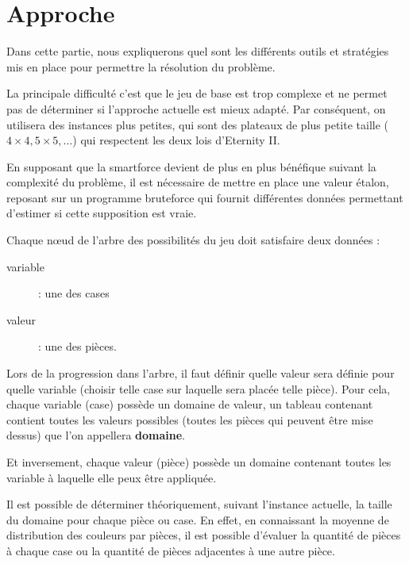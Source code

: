 
\section{Approche}

	Dans cette partie, nous expliquerons quel sont les différents outils et stratégies mis en place pour permettre la résolution du problème.
	
	La principale difficulté c'est que le jeu de base est trop complexe et ne permet pas de déterminer si l'approche actuelle est mieux adapté. Par conséquent, on utilisera des instances plus petites, qui sont des plateaux de plus petite taille ($4\times 4, 5\times 5, \dots$) qui respectent les deux lois d'Eternity II. 
	
	En supposant que la smartforce devient de plus en plus bénéfique suivant la complexité du problème, il est nécessaire de mettre en place une valeur étalon, reposant sur un programme bruteforce qui fournit différentes données permettant d'estimer si cette supposition est vraie.
	
	Chaque n\oe ud de l'arbre des possibilités du jeu doit satisfaire deux données :
	
	\begin{description}
		\item[variable] : une des cases
		\item[valeur] : une des pièces.
	\end{description}
	
	Lors de la progression dans l'arbre, il faut définir quelle valeur sera définie pour quelle variable (choisir telle case sur laquelle sera placée telle pièce). Pour cela, chaque variable (case) possède un domaine de valeur, un tableau contenant contient toutes les valeurs possibles (toutes les pièces qui peuvent être mise dessus) que l'on appellera \textbf{domaine}.
	
	Et inversement, chaque valeur (pièce) possède un domaine contenant toutes les variable à laquelle elle peux être appliquée.
	
	Il est possible de déterminer théoriquement, suivant l'instance actuelle, la taille du domaine pour chaque pièce ou case. En effet, en connaissant la moyenne de distribution des couleurs par pièces, il est possible d'évaluer la quantité de pièces à chaque case ou la quantité de pièces adjacentes à une autre pièce.
	
